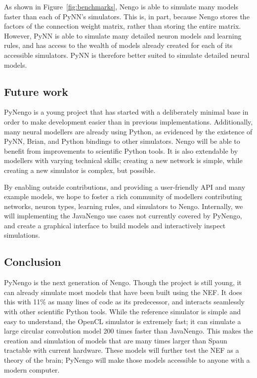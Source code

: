 \documentclass{frontiersSCNS}
\begin{document}
As shown in Figure~\ref{fig:benchmarks},
Nengo is able to simulate many models
faster than each of PyNN's simulators.
This is, in part,
because Nengo stores the factors
of the connection weight matrix,
rather than storing the entire matrix.
However, PyNN is able to simulate
many detailed neuron models
and learning rules,
and has access to the wealth of models
already created for each of its
accessible simulators.
PyNN is therefore better suited to
simulate detailed neural models.

\subsection{Future work}

PyNengo is a young project that
has started with a deliberately minimal base
in order to make development easier than in
previous implementations.
Additionally, many neural modellers
are already using Python,
as evidenced by the existence of
PyNN, Brian, and Python bindings to other simulators.
Nengo will be able to benefit
from improvements to scientific Python tools.
It is also extendable by modellers with
varying technical skills;
creating a new network is simple,
while creating a new simulator is complex, but possible.

By enabling outside contributions,
and providing a user-friendly API
and many example models,
we hope to foster a rich community of modellers
contributing networks, neuron types, learning rules,
and simulators to Nengo.
Internally, we will
implementing the JavaNengo use cases
not currently covered by PyNengo,
and create a graphical interface
to build models and
interactively inspect simulations.

\subsection{Conclusion}

PyNengo is the next generation of Nengo.
Though the project is still young,
it can already simulate most models
that have been built using the NEF.
It does this with 11\% as many lines of code
as its predecessor,
and interacts seamlessly with
other scientific Python tools.
While the reference simulator
is simple and easy to understand,
the OpenCL simulator is extremely fast;
it can simulate a large circular convolution model
200 times faster than JavaNengo.
This makes the creation and simulation
of models that are many times larger than Spaun
tractable with current hardware.
These models will further test
the NEF as a theory of the brain;
PyNengo will make those models
accessible to anyone with a modern computer.
\end{document}
